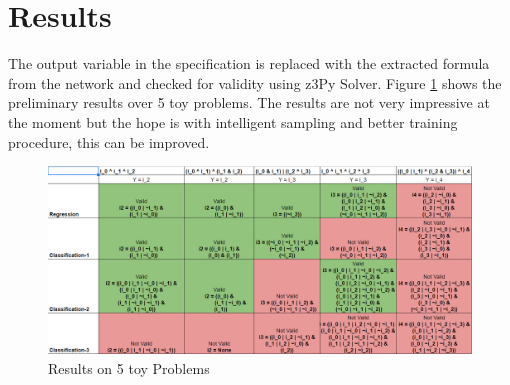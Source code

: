 \section{Results}
The output variable in the specification is replaced with the extracted formula from the network and checked for validity using z3Py Solver.
Figure \ref{fig:results} shows the preliminary results over 5 toy problems. The results are not very impressive at the moment but the hope 
is with intelligent sampling and better training procedure, this can be improved.

\begin{figure}
	\centering
    \includegraphics[scale=0.5]{results.png}
    \caption{Results on 5 toy Problems}
    \label{fig:results}
\end{figure}